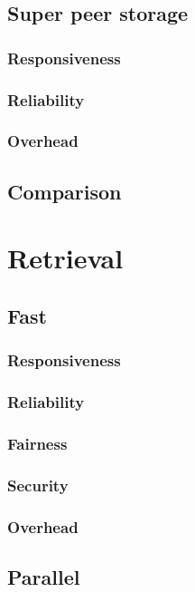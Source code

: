             \subsection{Super peer storage}
                \subsubsection{Responsiveness}
                \subsubsection{Reliability}
                \subsubsection{Overhead}
            \subsection{Comparison}

    \section{Retrieval}
            \subsection{Fast}
                \subsubsection{Responsiveness}
                \subsubsection{Reliability}
                \subsubsection{Fairness}
                \subsubsection{Security}
                \subsubsection{Overhead}
            \subsection{Parallel}
